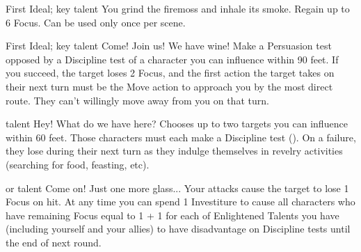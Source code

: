 \talent{\talentWillshaperFiremossName}
		{First Ideal; \talentWillshaperAlcoholName{} key talent}
		{\iconActionDouble}
		{You grind the firemoss and inhale its smoke.}
		{Regain up to 6 Focus. Can be used only once per scene.}

		
\talent{\talentWillshaperCallName}
		{First Ideal; \talentWillshaperAlcoholName{} key talent}
		{\iconActionDouble}
		{Come! Join us! We have wine!}
		{Make a Persuasion test opposed by a Discipline test of a character you can influence within 90 feet. If you succeed, the target loses 2 Focus, and the first action the target takes on their next turn must be the Move action to approach you by the most direct route. They can’t willingly move away from you on that turn.}
		
\talent{\talentWillshaperImpulseName}
		{\talentWillshaperCallName{} talent}
		{\iconAction}
		{Hey! What do we have here?}
		{Chooses up to two targets you can influence within 60 feet. Those characters must each make a Discipline test (\corruptedResistanceDC{}). On a failure, they lose \iconActionDouble{} during their next turn as they indulge themselves in revelry activities (searching for food, feasting, etc).}
	
\talent{\talentWillshaperInhibitionsName}
		{\talentWillshaperCallName{} or \talentWillshaperFiremossName{} talent}
		{\iconConstant}
		{Come on! Just one more glass...}
		{Your attacks cause the target to lose 1 Focus on hit. At any time you can spend 1 Investiture to cause all characters who have remaining Focus equal to 1 + 1 for each of Enlightened Talents you have (including yourself and your allies) to have disadvantage on Discipline tests until the end of next round.}
		

